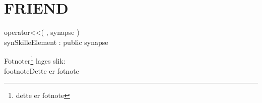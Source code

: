 \documentclass[norsk,11 pt]{report}
\begin{document}
	\section{FRIEND}
		\begin{description}
			\item[operator<<( , synapse )]
			\item[synSkilleElement : public synapse]
		\end{description}
	


Fotnoter\footnote{dette er fotnote} lages slik: \\footnote{Dette er fotnote}


%
%
\end{document}
